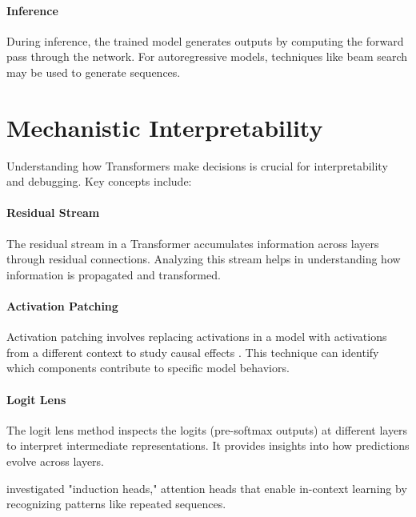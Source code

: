 
\paragraph{Inference}

During inference, the trained model generates outputs by computing the forward pass through the network. For autoregressive models, techniques like beam search may be used to generate sequences.


\section{Mechanistic Interpretability}\label{sec:mech_interp}


Understanding how Transformers make decisions is crucial for interpretability and debugging. Key concepts include:

\paragraph{Residual Stream}

The residual stream in a Transformer accumulates information across layers through residual connections. Analyzing this stream helps in understanding how information is propagated and transformed.

\paragraph{Activation Patching}

Activation patching involves replacing activations in a model with activations from a different context to study causal effects \parencite{olsson_-context_2022}. This technique can identify which components contribute to specific model behaviors.

\paragraph{Logit Lens}

The logit lens method inspects the logits (pre-softmax outputs) at different layers to interpret intermediate representations. It provides insights into how predictions evolve across layers.

\textcite{olsson_-context_2022} investigated "induction heads," attention heads that enable in-context learning by recognizing patterns like repeated sequences.

